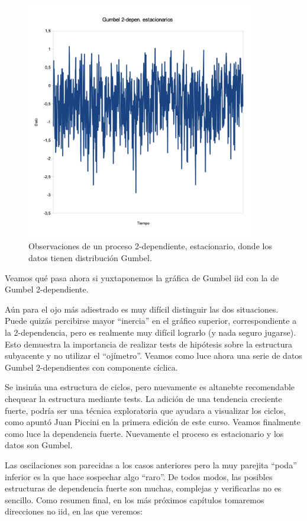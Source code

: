 \documentclass[
  oneside]{book}
\begin{document}
\begin{figure}
\centering
\includegraphics[width=0.9\textwidth,height=\textheight]{images/p3.png}
\caption{Observaciones de un proceso 2-dependiente, estacionario, donde
los datos tienen distribución Gumbel.}
\end{figure}

Veamos qué pasa ahora si yuxtaponemos la gráfica de Gumbel iid con la de
Gumbel 2-dependiente.

Aún para el ojo más adiestrado es muy difícil distinguir las dos
situaciones. Puede quizás percibirse mayor ``inercia'' en el gráfico
superior, correspondiente a la 2-dependencia, pero es realmente muy
difícil lograrlo (y nada seguro jugarse). Esto demuestra la importancia
de realizar tests de hipótesis sobre la estructura subyacente y no
utilizar el ``ojímetro''. Veamos como luce ahora una serie de datos
Gumbel 2-dependientes con componente cíclica.

Se insinúa una estructura de ciclos, pero nuevamente es altanebte
recomendable chequear la estructura mediante tests. La adición de una
tendencia creciente fuerte, podría ser una técnica exploratoria que
ayudara a visualizar los ciclos, como apuntó Juan Piccini en la primera
edición de este curso. Veamos finalmente como luce la dependencia
fuerte. Nuevamente el proceso es estacionario y los datos son Gumbel.

Las oscilaciones son parecidas a los casos anteriores pero la muy
parejita ``poda'' inferior es la que hace sospechar algo ``raro''. De
todos modos, las posibles estructuras de dependencia fuerte son muchas,
complejas y verificarlas no es sencillo. Como resumen final, en los más
próximos capítulos tomaremos direcciones no iid, en las que veremos:
\end{document}
